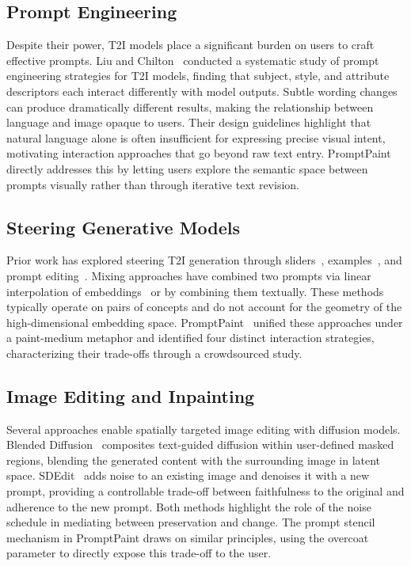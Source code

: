 \documentclass[sigconf]{acmart}
\begin{document}
\subsection{Prompt Engineering}

Despite their power, T2I models place a significant burden on users to craft
effective prompts. Liu and Chilton~\cite{liu2022promptengineering} conducted a
systematic study of prompt engineering strategies for T2I models, finding that
subject, style, and attribute descriptors each interact differently with model
outputs. Subtle wording changes can produce dramatically different results,
making the relationship between language and image opaque to users.
Their design guidelines highlight that natural language alone is often
insufficient for expressing precise visual intent, motivating interaction
approaches that go beyond raw text entry. PromptPaint directly addresses
this by letting users explore the semantic space between prompts visually
rather than through iterative text revision.

\subsection{Steering Generative Models}

Prior work has explored steering T2I generation through sliders~\cite{gandissect},
examples~\cite{gal2022image}, and prompt editing~\cite{brooks2023instructpix2pix}.
Mixing approaches have combined two prompts via linear interpolation of
embeddings~\cite{liu2022compositional} or by combining them textually.
These methods typically operate on pairs of concepts and do not account for
the geometry of the high-dimensional embedding space.
PromptPaint~\cite{chung2023promptpaint} unified these approaches under a
paint-medium metaphor and identified four distinct interaction strategies,
characterizing their trade-offs through a crowdsourced study.

\subsection{Image Editing and Inpainting}

Several approaches enable spatially targeted image editing with diffusion models.
Blended Diffusion~\cite{avrahami2022blended} composites text-guided diffusion
within user-defined masked regions, blending the generated content with the
surrounding image in latent space. SDEdit~\cite{meng2021sdedit} adds noise to
an existing image and denoises it with a new prompt, providing a controllable
trade-off between faithfulness to the original and adherence to the new
prompt. Both methods highlight the role of the noise schedule in mediating
between preservation and change. The prompt stencil mechanism in PromptPaint
draws on similar principles, using the overcoat parameter to directly expose
this trade-off to the user.
\end{document}
